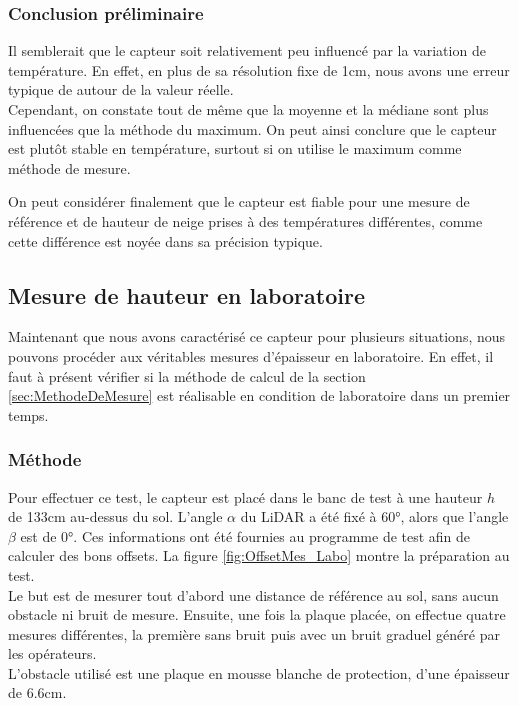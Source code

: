 \subsubsection{Conclusion préliminaire} 

Il semblerait que le capteur soit relativement peu influencé par la variation de température. En
effet, en plus de sa résolution fixe de 1cm, nous avons une erreur typique de \textpm 2cm autour
de la valeur réelle.\\
Cependant, on constate tout de même que la moyenne et la médiane sont plus influencées que la méthode
du maximum. On peut ainsi conclure que le capteur est plutôt stable en température, surtout si on
utilise le maximum comme méthode de mesure.\par 
On peut considérer finalement que le capteur est fiable pour une mesure de référence et de hauteur
de neige prises à des températures différentes, comme cette différence est noyée dans sa précision
typique.\newpage

\subsection{Mesure de hauteur en laboratoire}

Maintenant que nous avons caractérisé ce capteur pour plusieurs situations, nous pouvons procéder aux
véritables mesures d'épaisseur en laboratoire. En effet, il faut à présent vérifier si la méthode de
calcul de la section \ref{sec:MethodeDeMesure} est réalisable en condition de laboratoire dans un premier
temps.

\subsubsection{Méthode}

Pour effectuer ce test, le capteur est placé dans le banc de test à une hauteur $h$ de 133cm au-dessus
du sol. L'angle $\alpha$ du LiDAR a été fixé à 60°, alors que l'angle $\beta$ est de 0°. Ces informations 
ont été fournies au programme de test afin de calculer des bons offsets. La figure \ref{fig:OffsetMes_Labo}
montre la préparation au test.\\
Le but est de mesurer tout d'abord une distance de référence au sol, sans aucun obstacle ni bruit de
mesure. Ensuite, une fois la plaque placée, on effectue quatre mesures différentes, la première sans
bruit puis avec un bruit graduel généré par les opérateurs.\\
L'obstacle utilisé est une plaque en mousse blanche de protection, d'une épaisseur de 6.6cm.

